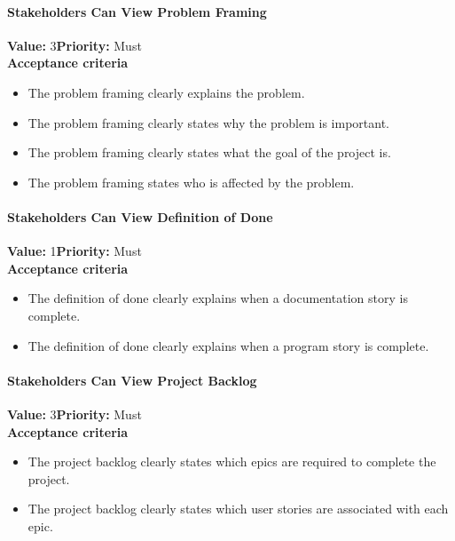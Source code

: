 \paragraph{Stakeholders Can View Problem Framing}
\textbf{Value:} 3\quad \textbf{Priority:} Must\\
\textbf{Acceptance criteria}
\begin{itemize}
  \item The problem framing clearly explains the problem.
  \item The problem framing clearly states why the problem is important.
  \item The problem framing clearly states what the goal of the project is.
  \item The problem framing states who is affected by the problem.
\end{itemize}

\paragraph{Stakeholders Can View Definition of Done}
\textbf{Value:} 1\quad \textbf{Priority:} Must\\
\textbf{Acceptance criteria}
\begin{itemize}
  \item The definition of done clearly explains when a documentation story is complete.
  \item The definition of done clearly explains when a program story is complete.
\end{itemize}

\paragraph{Stakeholders Can View Project Backlog}
\textbf{Value:} 3\quad \textbf{Priority:} Must\\
\textbf{Acceptance criteria}
\begin{itemize}
  \item The project backlog clearly states which epics are required to complete the project.
  \item The project backlog clearly states which user stories are associated with each epic.
\end{itemize}


